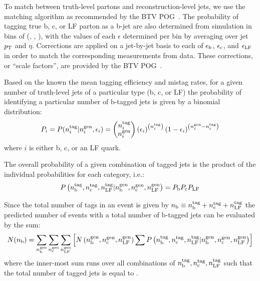 To match between truth-level partons and reconstruction-level jets, we use 
the matching algorithm as recommended by the BTV POG~\cite{btagMCTools}.
The probability of tagging true b, c, or LF parton as a b-jet 
are also determined from simulation in bins of (\njet, \scalht, \mht),
with the values of each $\epsilon$ determined per bin by averaging over jet 
$p_{\rm T}$ and $\eta$. Corrections are applied on a jet-by-jet basis to
each of $\epsilon_{\rm b}$, $\epsilon_{\rm c}$, and $\epsilon_{\rm
  LF}$ in order to match the corresponding measurements from
data. These corrections, or ``scale factors'', are provided by the BTV
POG~\cite{btagMCTools}.

Based on the known the mean tagging efficiency and mistag rates, for a given
number of truth-level jets of a particular type (b, c, or LF) the probability of
identifying a particular number of b-tagged jets is given by a binomial distribution:
\begin{equation}
P_i = P(n_{i}^{\rm tag}| n_{i}^{\rm gen}, \epsilon_{i}) =
     \left(\begin{matrix}n_{i}^{\rm tag} \\ n_{i}^{\rm gen}\end{matrix}\right)
     \left(\epsilon_i\right)^{\left(n_{i}^{\rm tag}\right)}
     \left(1 - \epsilon_i\right)^{\left(n_{i}^{\rm gen} - n_{i}^{\rm tag}\right)}
\end{equation}
where $i$ is either b, c, or an LF quark.

The overall probability of a given combination of tagged jets is the product of
the individual probabilities for each category, i.e.:
\begin{equation}
	P\left(n_{\rm b}^{\rm tag},  n_{\rm c}^{\rm tag}, n_{\rm LF}^{\rm tag}| 
  n_{\rm b}^{\rm gen},  n_{\rm c}^{\rm gen}, n_{\rm LF}^{\rm gen}\right) = 
	P_{\rm b} P_{\rm c} P_{\rm LF} 
\end{equation}

Since the total number of tags in an event is given by 
$n_{\text{b}} \equiv n_{\rm b}^{\rm tag} + n_{\rm c}^{\rm tag} + n_{\rm LF}^{\rm tag}$
the predicted number of events with a total number of b-tagged jets can be evaluated
by the sum:
\begin{equation}
	N(n_{\text{b}}) = \sum_{n_{\text{b}}^{\rm gen}} \sum_{n_{\rm c}^{\rm gen}} \sum_{n_{\rm LF}^{\rm gen}}
	\left[
N\left(n_{\text{b}}^{\rm gen},n_{\rm c}^{\rm gen},n_{\rm LF}^{\rm gen}\right)
\sum P\left(n_{\rm b}^{\rm tag},  n_{\rm c}^{\rm tag}, n_{\rm LF}^{\rm tag}| 
  n_{\rm b}^{\rm gen},  n_{\rm c}^{\rm gen}, n_{\rm LF}^{\rm gen}\right) 
	\right]
\end{equation}
where the inner-most sum runs over all combinations of 
$n_{\text{b}}^{\rm tag},n_{\rm c}^{\rm tag},n_{\rm LF}^{\rm tag}$
such that the total number of tagged jets is equal to \nb.

